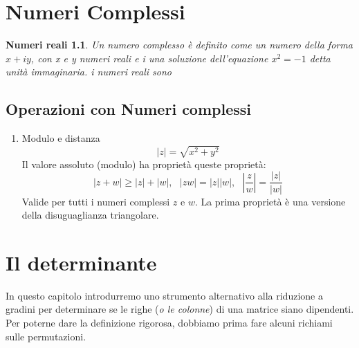 \documentclass{book}
\newcommand{\abs}[1]{\lvert#1\rvert}
\begin{document}
\chapter {Numeri Complessi}
\newtheorem{NumComp}{Numeri reali}
\begin{NumComp}
	Un numero complesso è definito come un numero della forma $x+iy$, con x e y numeri reali e i una
	soluzione dell'equazione $x^2=-1$ detta unità immaginaria. i numeri reali
	sono
\end{NumComp}
\section{Operazioni con Numeri complessi}
\begin{enumerate}
\item Modulo e distanza
	\begin{equation}
		\abs{z}=\sqrt{x^2+y^2}
	\end{equation}
	Il valore assoluto (modulo) ha proprietà queste proprietà:
	\begin{equation*}
		\abs{z+w}\geq \abs{z}+\abs{w}, \text{ } \abs{zw}=\abs{z}\abs{w}, \text{ } \left|\frac{z}{w}\right|=\frac{\abs z}{\abs w}
	\end{equation*}
	Valide per tutti i numeri complessi $z$ e $w$. La prima proprietà è una versione della disuguaglianza triangolare.

\end{enumerate}
\chapter{Il determinante \label{ildet}}
In questo capitolo introdurremo uno strumento alternativo alla riduzione a gradini per determinare se le righe ({\it o le colonne}) di una matrice siano dipendenti. Per poterne dare la definizione rigorosa, dobbiamo prima fare alcuni richiami sulle permutazioni.
\end{document}
